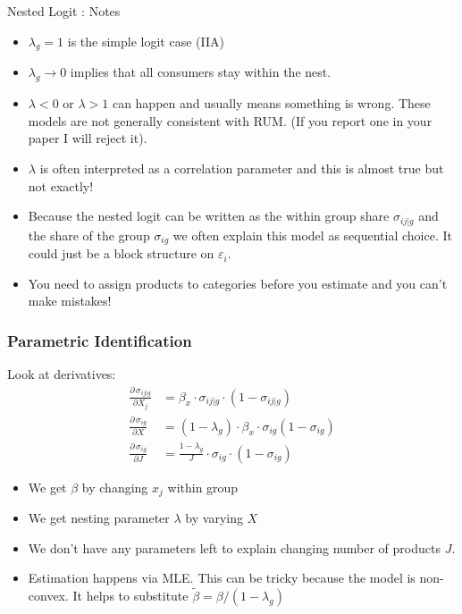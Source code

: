 \documentclass[aspectratio=169,11pt]{beamer}
\begin{document}
\begin{frame}{Nested Logit : Notes}
\begin{itemize}
\item $\lambda_g=1$ is the simple logit case (IIA)
\item $\lambda_g \rightarrow 0$ implies that all consumers stay within the nest.
\item $\lambda < 0$ or $\lambda > 1$ can happen and usually means something is wrong. These models are not generally consistent with RUM. (If you report one in your paper I will reject it).
\item $\lambda$ is often interpreted as a correlation parameter and this is almost true but not exactly!
\item Because the nested logit can be written as the within group share $\sigma_{ij|g}$ and the share of the group $\sigma_{ig}$ we often explain this model as \alert{sequential choice}. It could just be a \alert{block structure} on $\varepsilon_i$.
\item You need to assign products to categories \alert{before you estimate} and you can't make mistakes!
\end{itemize}
\end{frame}

\begin{frame}
\frametitle{Parametric Identification}
Look at derivatives:
\begin{align*}
\frac{\partial\, \sigma_{ij|g}}{\partial X_j} &= \beta_x \cdot \sigma_{ij|g} \cdot (1-\sigma_{ij|g}) \\
 \frac{\partial\, \sigma_{ig}}{\partial X} &= (1-\lambda_g) \cdot \beta_x \cdot \sigma_{ig}(1-\sigma_{ig}) \\
  \frac{\partial\, \sigma_{ig}}{\partial J} &= \frac{1-\lambda_g}{J} \cdot \sigma_{ig} \cdot (1-\sigma_{ig})
\end{align*}
\begin{itemize}
\item We get $\beta$ by changing $x_j$ within group
\item We get nesting parameter $\lambda$ by varying $X$
\item We don't have any parameters left to explain changing number of products $J$.
\item Estimation happens via MLE. This can be tricky because the model is non-convex. It helps to substitute $\tilde{\beta} = \beta/(1-\lambda_g)$
\end{itemize}
\end{frame}
\end{document}
